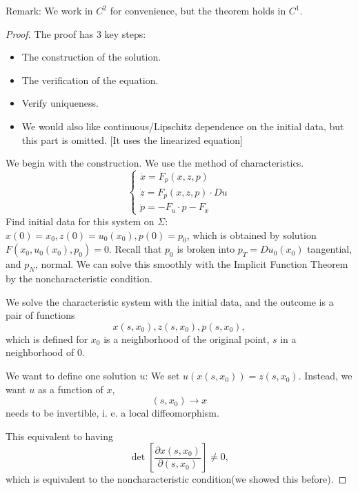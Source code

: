 \documentclass[11pt]{scrartcl}
\begin{document}
Remark: We work in $C^2$ for convenience, but the theorem holds in $C^1$.
\begin{proof}
The proof has 3 key steps:
\begin{itemize}
\item The construction of the solution.
\item The verification of the equation.
\item Verify uniqueness.
\item We would also like continuous/Lipschitz dependence on the initial data, but this part is omitted.  [It uses the linearized equation]
\end{itemize}
We begin with the construction.  We use the method of characteristics.  
$$\begin{cases}
\dot{x} = F_p(x, z, p)\\
\dot z = F_p(x, z, p) \cdot Du\\
\dot p = - F_u \cdot p - F_x
\end{cases}
$$
Find initial data for this system on $\Sigma:$ $x(0) = x_0, z(0) = u_0(x_0), p(0) = p_0$, which is obtained by solution $F(x_0, u_0(x_0), p_0) = 0$.  Recall that $p_0$ is broken into $p_T = Du_0(x_0)$ tangential, and $p_N$, normal.  We can solve this smoothly with the Implicit Function Theorem by the noncharacteristic condition.  

We solve the characteristic system with the initial data, and the outcome is a pair of functions 
$$x(s, x_0), z(s, x_0), p(s, x_0),$$
which is defined for $x_0$ is a neighborhood of the original point, $s$ in a neighborhood of $0$.

We want to define one solution $u$: We set $u(x(s, x_0)) = z(s, x_0)$.  Instead, we want $u$ as a function of $x$,
$$(s, x_0) \rightarrow x$$ needs to be invertible, i. e. a local diffeomorphism.

This equivalent to having 
$$\det \left [\frac{\partial x(s, x_0)}{\partial (s, x_0)}\right ] \ne 0,$$
which is equivalent to the noncharacteristic condition(we showed this before).
\end{proof}
\end{document}
